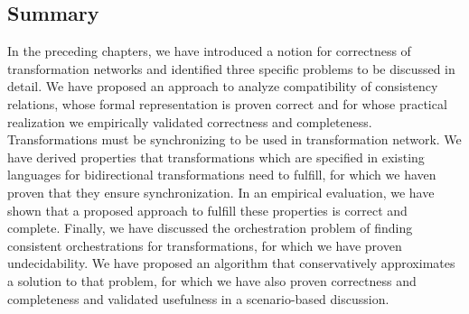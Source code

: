 



\subsection{Summary}

In the preceding chapters, we have introduced a notion for correctness of transformation networks and identified three specific problems to be discussed in detail.
We have proposed an approach to analyze compatibility of consistency relations, whose formal representation is proven correct and for whose practical realization we empirically validated correctness and completeness.
Transformations must be synchronizing to be used in transformation network.
We have derived properties that transformations which are specified in existing languages for bidirectional transformations need to fulfill, for which we haven proven that they ensure synchronization.
In an empirical evaluation, we have shown that a proposed approach to fulfill these properties is correct and complete.
Finally, we have discussed the orchestration problem of finding consistent orchestrations for transformations, for which we have proven undecidability.
We have proposed an algorithm that conservatively approximates a solution to that problem, for which we have also proven correctness and completeness and validated usefulness in a scenario-based discussion.

